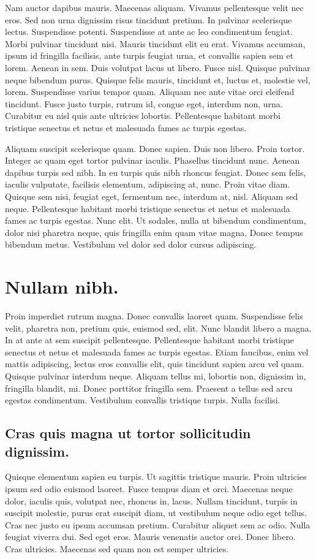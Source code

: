 Nam auctor dapibus mauris. Maecenas aliquam. Vivamus pellentesque velit nec eros. Sed non urna dignissim risus tincidunt pretium. In pulvinar scelerisque lectus. Suspendisse potenti. Suspendisse at ante ac leo condimentum feugiat. Morbi pulvinar tincidunt nisi. Mauris tincidunt elit eu erat. Vivamus accumsan, ipsum id fringilla facilisis, ante turpis feugiat urna, et convallis sapien sem et lorem. Aenean in sem. Duis volutpat lacus ut libero. Fusce nisl. Quisque pulvinar neque bibendum purus. Quisque felis mauris, tincidunt et, luctus et, molestie vel, lorem. Suspendisse varius tempor quam. Aliquam nec ante vitae orci eleifend tincidunt. Fusce justo turpis, rutrum id, congue eget, interdum non, urna. Curabitur eu nisl quis ante ultricies lobortis. Pellentesque habitant morbi tristique senectus et netus et malesuada fames ac turpis egestas.

Aliquam suscipit scelerisque quam. Donec sapien. Duis non libero. Proin tortor. Integer ac quam eget tortor pulvinar iaculis. Phasellus tincidunt nunc. Aenean dapibus turpis sed nibh. In eu turpis quis nibh rhoncus feugiat. Donec sem felis, iaculis vulputate, facilisis elementum, adipiscing at, nunc. Proin vitae diam. Quisque sem nisi, feugiat eget, fermentum nec, interdum at, nisl. Aliquam sed neque. Pellentesque habitant morbi tristique senectus et netus et malesuada fames ac turpis egestas. Nunc elit. Ut sodales, nulla ut bibendum condimentum, dolor nisi pharetra neque, quis fringilla enim quam vitae magna. Donec tempus bibendum metus. Vestibulum vel dolor sed dolor cursus adipiscing.

\section{Nullam nibh.}
Proin imperdiet rutrum magna. Donec convallis laoreet quam. Suspendisse felis velit, pharetra non, pretium quis, euismod sed, elit. Nunc blandit libero a magna. In at ante at sem suscipit pellentesque. Pellentesque habitant morbi tristique senectus et netus et malesuada fames ac turpis egestas. Etiam faucibus, enim vel mattis adipiscing, lectus eros convallis elit, quis tincidunt sapien arcu vel quam. Quisque pulvinar interdum neque. Aliquam tellus mi, lobortis non, dignissim in, fringilla blandit, mi. Donec porttitor fringilla sem. Praesent a tellus sed arcu egestas condimentum. Vestibulum convallis tristique turpis. Nulla facilisi.

\subsection{Cras quis magna ut tortor sollicitudin dignissim.}
Quisque elementum sapien eu turpis. Ut sagittis tristique mauris. Proin ultricies ipsum sed odio euismod laoreet. Fusce tempus diam et orci. Maecenas neque dolor, iaculis quis, volutpat nec, rhoncus in, lacus. Nullam tincidunt, turpis in suscipit molestie, purus erat suscipit diam, ut vestibulum neque odio eget tellus. Cras nec justo eu ipsum accumsan pretium. Curabitur aliquet sem ac odio. Nulla feugiat viverra dui. Sed eget eros. Mauris venenatis auctor orci. Donec libero. Cras ultricies. Maecenas sed quam non est semper ultricies.


